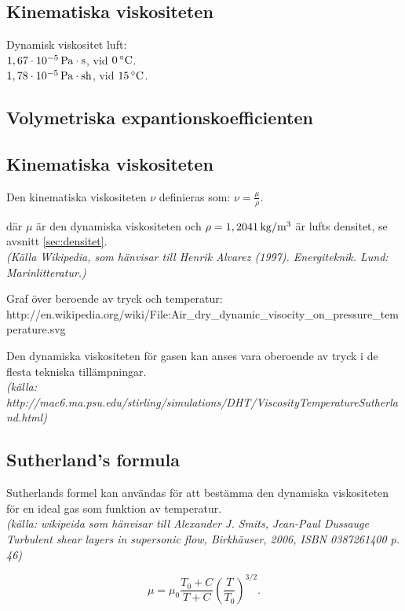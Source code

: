\subsection{Kinematiska viskositeten} %
Dynamisk viskositet luft:\\
$\unit[1,67\cdot10^{-5}]{Pa\cdot s}$, vid $\unit[0]{^\circ C}$.\\
$\unit[1,78\cdot10^{-5}]{Pa\cdot sh}$, vid $\unit[15]{^\circ C}$.


\subsection{Volymetriska expantionskoefficienten}

\subsection{Kinematiska viskositeten}


Den kinematiska viskositeten $\nu$ definieras som: $\nu = \frac {\mu} {\rho}.$


där $\mu$ är den dynamiska viskositeten och $\rho=\unit[1,2041]{kg/m^3}$ är lufts densitet, se avsnitt \ref{sec:densitet}.\\
\emph{(Källa Wikipedia, som hänvisar till Henrik Alvarez (1997). Energiteknik. Lund: Marinlitteratur.)}

Graf över beroende av tryck och temperatur:\\
http://en.wikipedia.org/wiki/File:Air\_dry\_dynamic\_visocity\_on\_pressure\_temperature.svg

Den dynamiska viskositeten för gasen kan anses vara oberoende av tryck i de flesta tekniska tillämpningar. \\
\emph{(källa: http://mac6.ma.psu.edu/stirling/simulations/DHT/ViscosityTemperatureSutherland.html)}

\subsection{Sutherland's formula}
Sutherlands formel kan användas för att bestämma den dynamiska viskositeten för en ideal gas som funktion av temperatur.\\
\emph{(källa: wikipeida som hänvisar till Alexander J. Smits, Jean-Paul Dussauge Turbulent shear layers in supersonic flow, Birkhäuser, 2006, ISBN 0387261400 p. 46)}

\begin{equation}
{\mu} = {\mu}_0 \frac {T_0+C} {T + C} \left (\frac {T} {T_0} \right )^{3/2}.
\end{equation}


